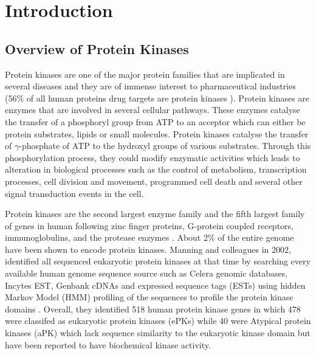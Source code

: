 \documentclass[a4paper, 11pt]{article}
\begin{document}


\section*{Introduction}
\subsection*{Overview of Protein Kinases}
Protein kinases are one of the major protein families that are implicated in several diseases and they are of immense interest to pharmaceutical industries (56\% of all human proteins drug targets are protein kinases \cite{santos2017comprehensive}). Protein kinases are enzymes that are involved in several cellular pathways. These enzymes catalyse the transfer of a phosphoryl group from ATP to an acceptor which  can either be protein substrates, lipids or small molecules. Protein kinases catalyse the transfer of $\gamma$-phosphate of ATP to the hydroxyl groups of various substrates. Through this phosphorylation process, they could modify enzymatic activities which leads to alteration in biological processes such as the control of metabolism, transcription processes, cell division and movement, programmed cell death and several other signal transduction events in the cell. \par
Protein kinases are the second largest enzyme family and the fifth largest family of genes in human following zinc finger proteins, G-protein coupled receptors, immunoglobulins, and the protease enzymes \cite{roskoski2016classification}. About 2\% of the entire genome have been shown to encode protein kinases. Manning and colleagues in 2002, identified all sequenced eukaryotic protein kinases at that time by searching every available human genome sequence source such as  Celera genomic databases, Incytes EST, Genbank cDNAs and expressed sequence tags (ESTs) using hidden Markov Model (HMM) profiling of the sequences to profile the protein kinase domains \cite{manning2002protein}. Overall, they identified 518 human protein kinase genes in which 478 were classifed as eukaryotic protein kinases (ePKs) while 40 were Atypical protein kinases (aPK) which lack sequence similarity to the eukaryotic kinase domain but have been reported to have biochemical kinase activity.\par
\end{document}
